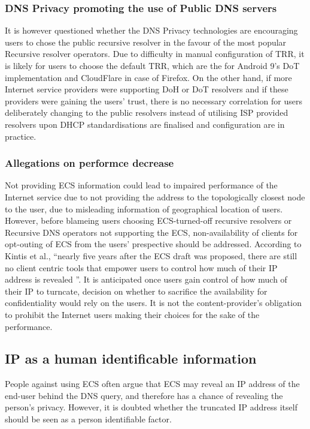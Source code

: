 \subsubsection{DNS Privacy promoting the use of Public DNS servers}
It is however questioned whether the DNS Privacy technologies are encouraging users to chose the public recursive resolver in the favour of the most popular Recursive resolver operators.
Due to difficulty in manual configuration of TRR, it is likely for users to choose the default TRR, which are the \cite{dnsprivacy-test-servers} for Android 9's DoT implementation \cite{android-pie-dot} and CloudFlare in case of Firefox.
On the other hand, if more Internet service providers were supporting DoH or DoT resolvers and if these providers were gaining the users' trust, there is no necessary correlation for users deliberately changing to the public resolvers instead of utilising ISP provided resolvers upon DHCP standardisations \cite{peterson-doh-dhcp-00, peterson-dot-dhcp-00} are finalised and configuration are in practice.

\subsubsection{Allegations on performce decrease}
Not providing ECS information could lead to impaired performance of the Internet service due to not providing the address to the topologically closest node to the user, due to misleading information of geographical location of users.
However, before blameing users choosing ECS-turned-off recursive resolvers or Recursive DNS operators not supporting the ECS, non-availability of clients for opt-outing of ECS from the users' prespective should be addressed.
According to Kintis et al., ``nearly five years after the ECS draft was proposed, there are still no client centric tools that empower users to control how much of their IP address is revealed \cite{kintis2016understanding}''.
It is anticipated once users gain control of how much of their IP to turncate, decision on whether to sacrifice the availability for confidentiality would rely on the users. It is not the content-provider's obligation to prohibit the Internet users making their choices for the sake of the performance.

\subsection{IP as a human identificable information}
People against using ECS often argue that ECS may reveal an IP address of the end-user behind the DNS query, and therefore has a chance of revealing the person's privacy.
However, it is doubted whether the truncated IP address itself should be seen as a person identifiable factor.

